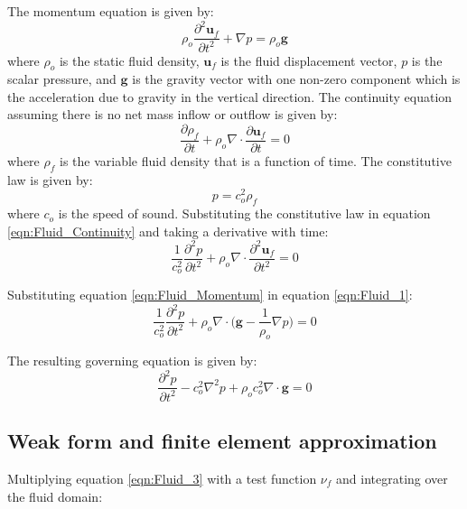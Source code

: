 \documentclass[3p]{elsarticle}
\begin{document}
\noindent The momentum equation is given by:
\begin{equation}
    \label{eqn:Fluid_Momentum}
    \rho_o \frac{\partial^2 \mathbf{u}_f}{\partial t^2}+\nabla p = \rho_o\mathbf{g}
\end{equation}
\noindent where $\rho_o$ is the static fluid density, $\mathbf{u}_f$ is the fluid displacement vector, $p$ is the scalar pressure, and $\mathbf{g}$ is the gravity vector with one non-zero component which is the acceleration due to gravity in the vertical direction. The continuity equation assuming there is no net mass inflow or outflow is given by:
\begin{equation}
    \label{eqn:Fluid_Continuity}
    \frac{\partial \rho_f}{\partial t}+\rho_o \nabla \cdot \frac{\partial \mathbf{u}_f}{\partial t} = 0
\end{equation}
\noindent where $\rho_f$ is the variable fluid density that is a function of time. The constitutive law is given by:
\begin{equation}
    \label{eqn:Fluid_Constitutive}
    p = c_o^2 \rho_f
\end{equation}
\noindent where $c_o$ is the speed of sound. Substituting the constitutive law in equation \eqref{eqn:Fluid_Continuity} and taking a derivative with time:
\begin{equation}
    \label{eqn:Fluid_1}
    \frac{1}{c_o^2} \frac{\partial^2 p}{\partial t^2} + \rho_o \nabla \cdot \frac{\partial^2 \mathbf{u}_f}{\partial t^2} = 0
\end{equation}

\noindent Substituting equation \eqref{eqn:Fluid_Momentum} in equation \eqref{eqn:Fluid_1}:
\begin{equation}
    \label{eqn:Fluid_2}
    \frac{1}{c_o^2} \frac{\partial^2 p}{\partial t^2} + \rho_o \nabla \cdot \Big(\mathbf{g}-\frac{1}{\rho_o} \nabla p\Big) = 0
\end{equation}

\noindent The resulting governing equation is given by:
\begin{equation}
    \label{eqn:Fluid_3}
    \frac{\partial^2 p}{\partial t^2} - c_o^2 \nabla^2p + \rho_o c_o^2 \nabla \cdot \mathbf{g} = 0
\end{equation}

\subsection{Weak form and finite element approximation}
\vspace{0.2in}
\noindent Multiplying equation \eqref{eqn:Fluid_3} with a test function $\nu_f$ and integrating over the fluid domain:
\end{document}
